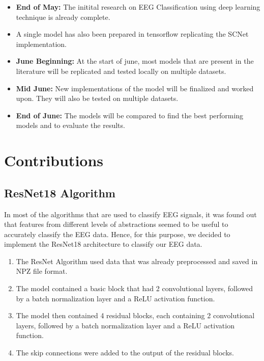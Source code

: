 \documentclass[10pt]{article}
\begin{document}
\begin{itemize}
    \item \textbf{End of May:} The initital research on EEG Classification using deep learning technique is already complete.
    \item A single model has also been prepared in tensorflow replicating the SCNet implementation.
    \item \textbf{June Beginning:} At the start of june, most models that are present in the literature will be replicated and tested locally on multiple datasets.
    \item \textbf{Mid June:} New implementations of the model will be finalized and worked upon. They will also be tested on multiple datasets.
    \item \textbf{End of June:} The models will be compared to find the best performing models and to evaluate the results.
\end{itemize}














\section{Contributions} 

\subsection{ResNet18 Algorithm}
In most of the algorithms that are used to classify EEG signals, it was found out that features from different levels of abstractions seemed to be useful to accurately classify the EEG data. Hence, for this purpose, we decided to implement the ResNet18 architecture to classify our EEG data.
\begin{enumerate}
    \item The ResNet Algorithm used data that was already preprocessed and saved in NPZ file format.
    \item The model contained a basic block that had 2 convolutional layers, followed by a batch normalization layer and a ReLU activation function.
    \item The model then contained 4 residual blocks, each containing 2 convolutional layers, followed by a batch normalization layer and a ReLU activation function.
    \item The skip connections were added to the output of the residual blocks.
\end{enumerate}
\end{document}
